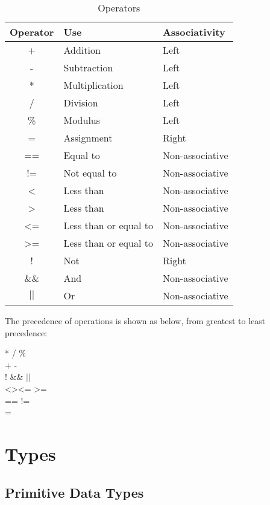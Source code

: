 \documentclass[a4paper]{article}
\begin{document}
\begin{table}[H]
\centering
\begin{tabular}{|c|l|l|}
\hline
Operator & Use & Associativity\\
\hline
+ & Addition & Left\\
\hline
- & Subtraction & Left \\
\hline
* & Multiplication & Left\\
\hline
/ & Division & Left \\
\hline
\% & Modulus & Left \\
\hline
= & Assignment & Right \\
\hline 
== & Equal to & Non-associative\\
\hline
!= & Not equal to & Non-associative\\
\hline 
\textless & Less than & Non-associative\\
\hline 
\textgreater & Less than & Non-associative\\
\hline 
\textless= & Less than or equal to & Non-associative\\
\hline 
\textgreater= & Less than or equal to & Non-associative\\
\hline 
! & Not & Right\\
\hline
\&\& & And & Non-associative\\
\hline
$||$ & Or & Non-associative\\
\hline
\end{tabular}
\caption{Operators}
\end{table}

The precedence of operations is shown as below, from greatest to least precedence: 
\begin{center}

\selectfont
* / \% \\
+ - \\ 
! \&\& $||$ \\
\textless \quad  \textgreater \quad \textless= \quad \textgreater= \\
== \quad !=\\
=\\ 
\end{center}


\section{Types}

\subsection{Primitive Data Types}
\end{document}
